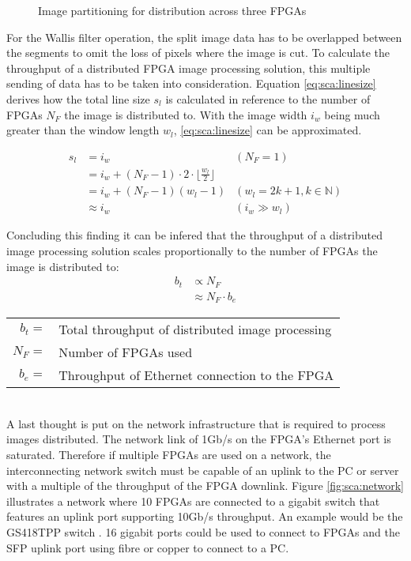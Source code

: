 \begin{figure}[b!]
    \centering
    \begin{adjustbox}{max width=\linewidth}
        
    \end{adjustbox}
    \caption{Image partitioning for distribution across three FPGAs}
    \label{fig:sca:acrossfpgapart}
\end{figure}

For the Wallis filter operation, the split image data has to be overlapped
between the
segments to omit the loss of pixels where the image is cut. To calculate the
throughput of a distributed FPGA image processing solution, this multiple
sending of data has to be taken into consideration. Equation 
\ref{eq:sca:linesize} derives how the total line size $s_l$ is calculated in
reference to the number of FPGAs $N_F$ the image is distributed to. With the
image width $i_w$ being much greater than the window length $w_l$, 
\ref{eq:sca:linesize} can be approximated.

\begin{align}
    s_l  & = i_w & (N_F = 1) \\
         & = i_w + (N_F-1) \cdot 2 \cdot \lfloor\frac{w_l}{2}\rfloor & \\
         & = i_w + (N_F-1)(w_l-1) & (w_l=2k+1, k \in \mathbb{N} )\\
         & \approx i_w & (i_w \gg w_l)
    \label{eq:sca:linesize}
\end{align}

Concluding this finding it can be infered that the throughput of a distributed
image processing solution scales proportionally to the number of FPGAs the image
is distributed to:
\begin{align}
    b_t & \propto N_F \\
        & \approx N_F \cdot b_e
\end{align}
\begin{tabular}{rl}
    $b_t        =$ & Total throughput of distributed image processing \\
    $N_F        =$ & Number of FPGAs used \\
    $b_e        =$ & Throughput of Ethernet connection to the FPGA \\
\end{tabular} \\

A last thought is put on the network infrastructure that is required to
process images distributed. The network link of 1Gb/s on the FPGA's Ethernet
port is saturated. Therefore if multiple FPGAs are used on a network, the
interconnecting network switch must be capable of an uplink to the PC or server
with a multiple of the throughput of the FPGA downlink. Figure 
\ref{fig:sca:network} illustrates a network where 10 FPGAs are connected to a
gigabit switch that features an uplink port supporting 10Gb/s throughput. An
example would be the GS418TPP switch \cite{netgearswitch}. 16 gigabit ports
could be used to connect to FPGAs and the SFP uplink port using fibre or copper
to connect to a PC.


